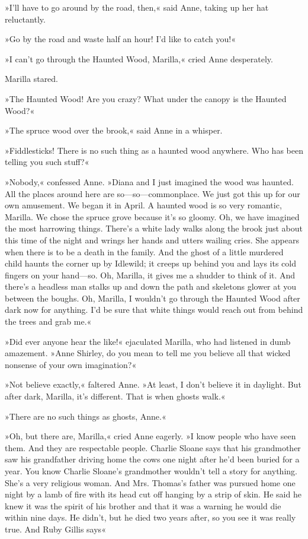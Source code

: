 »I’ll have to go around by the road, then,« said Anne, taking up her hat reluctantly.

»Go by the road and waste half an hour! I’d like to catch you!«

»I can’t go through the Haunted Wood, Marilla,« cried Anne desperately.

Marilla stared.

»The Haunted Wood! Are you crazy? What under the canopy is the Haunted Wood?«

»The spruce wood over the brook,« said Anne in a whisper.

»Fiddlesticks! There is no such thing as a haunted wood anywhere. Who has been telling you such stuff?«

»Nobody,« confessed Anne. »Diana and I just imagined the wood was haunted. All the places around here are so—so—commonplace. We just got this up for our own amusement. We began it in April. A haunted wood is so very romantic, Marilla. We chose the spruce grove because it’s so gloomy. Oh, we have imagined the most harrowing things. There’s a white lady walks along the brook just about this time of the night and wrings her hands and utters wailing cries. She appears when there is to be a death in the family. And the ghost of a little murdered child haunts the corner up by Idlewild; it creeps up behind you and lays its cold fingers on your hand—so. Oh, Marilla, it gives me a shudder to think of it. And there’s a headless man stalks up and down the path and skeletons glower at you between the boughs. Oh, Marilla, I wouldn’t go through the Haunted Wood after dark now for anything. I’d be sure that white things would reach out from behind the trees and grab me.«

»Did ever anyone hear the like!« ejaculated Marilla, who had listened in dumb amazement. »Anne Shirley, do you mean to tell me you believe all that wicked nonsense of your own imagination?«

»Not believe exactly,« faltered Anne. »At least, I don’t believe it in daylight. But after dark, Marilla, it’s different. That is when ghosts walk.«

»There are no such things as ghosts, Anne.«

»Oh, but there are, Marilla,« cried Anne eagerly. »I know people who have seen them. And they are respectable people. Charlie Sloane says that his grandmother saw his grandfather driving home the cows one night after he’d been buried for a year. You know Charlie Sloane’s grandmother wouldn’t tell a story for anything. She’s a very religious woman. And Mrs. Thomas’s father was pursued home one night by a lamb of fire with its head cut off hanging by a strip of skin. He said he knew it was the spirit of his brother and that it was a warning he would die within nine days. He didn’t, but he died two years after, so you see it was really true. And Ruby Gillis says\longdash«


